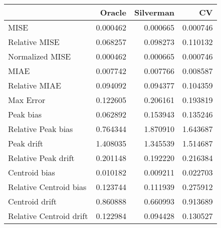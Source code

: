 \begin{tabular}{lrrr}
  \hline
 & Oracle & Silverman & CV \\ 
  \hline
MISE & 0.000462 & 0.000665 & 0.000746 \\ 
  Relative MISE & 0.068257 & 0.098273 & 0.110132 \\ 
  Normalized MISE & 0.000462 & 0.000665 & 0.000746 \\ 
  MIAE & 0.007742 & 0.007766 & 0.008587 \\ 
  Relative MIAE & 0.094092 & 0.094377 & 0.104359 \\ 
  Max Error & 0.122605 & 0.206161 & 0.193819 \\ 
  Peak bias & 0.062892 & 0.153943 & 0.135246 \\ 
  Relative Peak bias & 0.764344 & 1.870910 & 1.643687 \\ 
  Peak drift & 1.408035 & 1.345539 & 1.514687 \\ 
  Relative Peak drift & 0.201148 & 0.192220 & 0.216384 \\ 
  Centroid bias & 0.010182 & 0.009211 & 0.022703 \\ 
  Relative Centroid bias & 0.123744 & 0.111939 & 0.275912 \\ 
  Centroid drift & 0.860888 & 0.660993 & 0.913689 \\ 
  Relative Centroid drift & 0.122984 & 0.094428 & 0.130527 \\ 
   \hline
\end{tabular}
